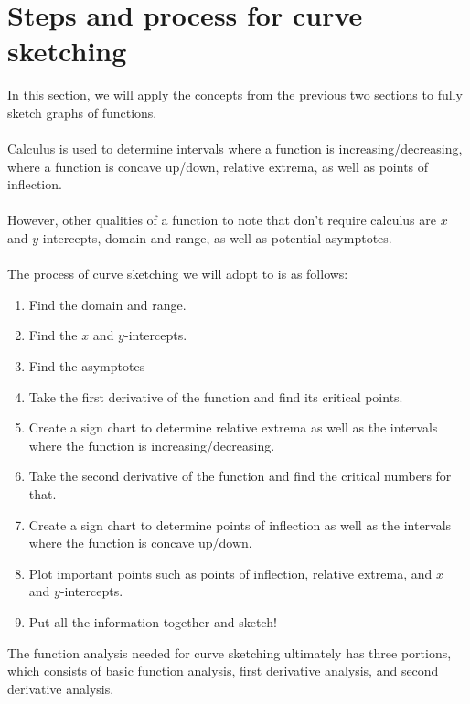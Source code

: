 \documentclass[11pt]{scrartcl}
\begin{document}
\maketitle
\noindent

\section{Steps and process for curve sketching}
\noindent
In this section, we will apply the concepts from the previous two sections to fully sketch graphs of functions. \\
\\
\noindent 
Calculus is used to determine intervals where a function is increasing/decreasing, where a function is concave up/down, relative extrema, as well as points of inflection. \\
\\
\noindent 
However, other qualities of a function to note that don't require calculus are $x$ and $y$-intercepts, domain and range, as well as potential asymptotes. \\
\\
\noindent 
The process of curve sketching we will adopt to is as follows: 
\begin{enumerate}
    \item Find the domain and range.
    \item Find the $x$ and $y$-intercepts.
    \item Find the asymptotes 
    \item Take the first derivative of the function and find its critical points.
    \item Create a sign chart to determine relative extrema as well as the intervals where the function is increasing/decreasing.
    \item Take the second derivative of the function and find the critical numbers for that. 
    \item Create a sign chart to determine points of inflection as well as the intervals where the function is concave up/down.
    \item Plot important points such as points of inflection, relative extrema, and $x$ and $y$-intercepts. 
    \item Put all the information together and sketch!
\end{enumerate}
\noindent 
The function analysis needed for curve sketching ultimately has three portions, which consists of basic function analysis, first derivative analysis, and second derivative analysis.
\end{document}
